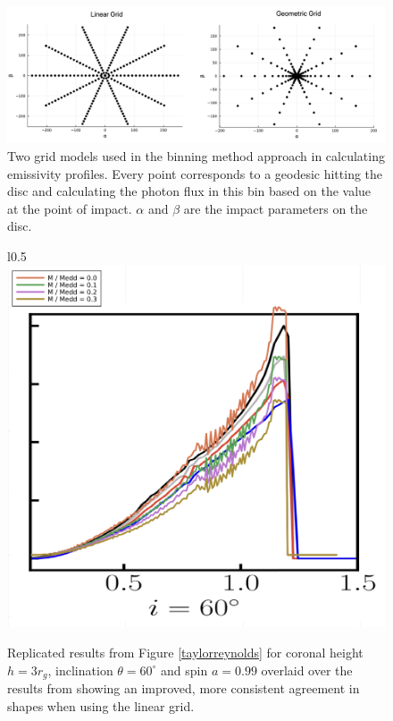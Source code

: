 \documentclass[fleqn,usenatbib,useAMS]{mnras}
\begin{document}
\begin{figure}
    \centering
    \includegraphics[width=0.98\linewidth]{figures/grid.png}
    \caption{Two grid models used in the binning method approach in calculating emissivity profiles. Every point corresponds to a geodesic hitting the disc and calculating the photon flux in this bin based on the value at the point of impact. $\alpha$ and $\beta$ are the impact parameters on the disc.}
    \label{grid}
\end{figure}

\begin{figure}{l}{0.5\textwidth}
\includegraphics[width=\linewidth]{figures/lineargrid.png}
\caption{Replicated results from Figure \ref{taylorreynolds} for coronal height $h = 3 r_{g}$, inclination $\theta = 60^{\circ}$ and spin $a = 0.99$ overlaid over the results from \cite{taylor2018exploring} showing an improved, more consistent agreement in shapes when using the linear grid.}
\label{lineargrid}
\end{figure}
\end{document}
